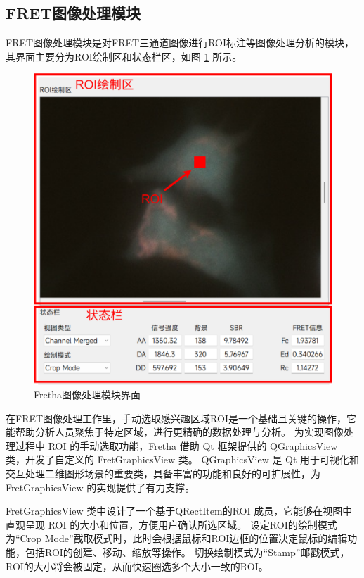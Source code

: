 \subsection{FRET图像处理模块}
\label{sec:FRET图像处理模块}
FRET图像处理模块是对FRET三通道图像进行ROI标注等图像处理分析的模块，其界面主要分为ROI绘制区和状态栏区，如图 \ref{fig:fretha_imageprocess_ui} 所示。
\begin{figure}[htbp]
    \centering
    \includegraphics[width=0.6\linewidth]{../figures/2/Fretha图像处理界面.drawio.png}
    \caption{Fretha图像处理模块界面}
    \label{fig:fretha_imageprocess_ui}
\end{figure}
在FRET图像处理工作里，手动选取感兴趣区域ROI是一个基础且关键的操作，它能帮助分析人员聚焦于特定区域，进行更精确的数据处理与分析。
为实现图像处理过程中 ROI 的手动选取功能，Fretha 借助 Qt 框架提供的 QGraphicsView 类，开发了自定义的 FretGraphicsView 类。
QGraphicsView 是 Qt 用于可视化和交互处理二维图形场景的重要类，具备丰富的功能和良好的可扩展性，为 FretGraphicsView 的实现提供了有力支撑。

FretGraphicsView 类中设计了一个基于QRectItem的ROI 成员，它能够在视图中直观呈现 ROI 的大小和位置，方便用户确认所选区域。
设定ROI的绘制模式为“Crop Mode”截取模式时，此时会根据鼠标和ROI边框的位置决定鼠标的编辑功能，包括ROI的创建、移动、缩放等操作。
切换绘制模式为“Stamp”邮戳模式，ROI的大小将会被固定，从而快速圈选多个大小一致的ROI。

